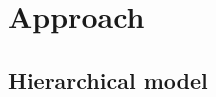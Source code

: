\documentclass{bioinfo}
\begin{document}



\section{Approach}
\subsection{Hierarchical model}
\end{document}
